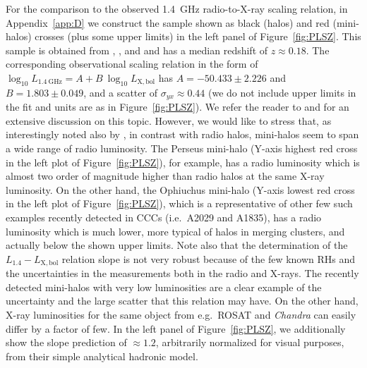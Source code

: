 \documentclass[traditabstract]{aa}
\newcommand{\rmn}{\mathrm}
\begin{document}
For the comparison to the observed 1.4~GHz radio-to-X-ray scaling relation, in Appendix~\ref{app:D} we construct the sample shown as black (halos) and red (mini-halos) crosses (plus some upper limits) in the left panel of Figure~\ref{fig:PLSZ}. This sample is obtained from \cite{2009A&A...507..661B}, \cite{2011A&A...527A..99E},  and \cite{2009A&A...499..371G} and has a median redshift of $z\approx0.18$. The corresponding observational scaling relation in the form of $\log_{10} L_{1.4~\rmn{GHz}} = A + B~\log_{10} L_{\rmn{X,bol}}$ has $A=-50.433\pm2.226$ and $B=1.803\pm0.049$, and a scatter of $\sigma_{yx} \approx 0.44$ (we do not include upper limits in the fit and units are as in Figure~\ref{fig:PLSZ}). We refer the reader to \cite{2009A&A...507..661B} and \cite{2011A&A...527A..99E} for an extensive discussion on this topic. However, we would like to stress that, as interestingly noted also by \cite{2009A&A...499..679M}, in contrast with radio halos, mini-halos seem to span a wide range of radio luminosity. The Perseus mini-halo (Y-axis highest red cross in the left plot of Figure~\ref{fig:PLSZ}), for example, has a radio luminosity which is almost two order of magnitude higher than radio halos at the same X-ray luminosity. On the other hand, the Ophiuchus mini-halo (Y-axis lowest red cross in the left plot of Figure~\ref{fig:PLSZ}), which is a representative of other few such examples recently detected in CCCs (i.e.~A2029 and A1835), has a radio luminosity which is much lower, more typical of halos in merging clusters, and actually below the shown upper limits. Note also that the determination of the $L_{1.4}-L_{\rmn{X,bol}}$ relation slope is not very robust because of the few known RHs and the uncertainties in the measurements both in the radio and X-rays. The recently detected mini-halos with very low luminosities are a clear example of the uncertainty and the large scatter that this relation may have. On the other hand, X-ray luminosities for the same object from e.g.~ROSAT and \emph{Chandra} can easily differ by a factor of few. In the left panel of Figure~\ref{fig:PLSZ}, we additionally show the \cite{2009JCAP...09..024K} slope prediction of $\approx1.2$, arbitrarily normalized for visual purposes, from their simple analytical hadronic model.
\end{document}
